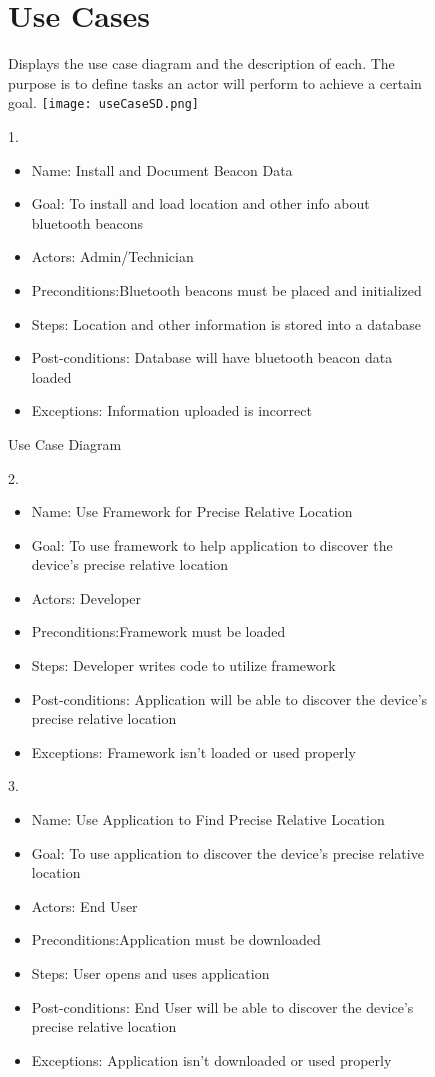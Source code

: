 \begin{figure}
\chapter{Use Cases}
Displays the use case diagram and the description of each. The purpose is to define tasks an actor will perform to achieve a certain goal.
\newline
\texttt{[image: useCaseSD.png]}
\caption{Use Case Diagram}

1.
\begin{itemize}
\item Name: Install and Document Beacon Data
\item Goal: To install and load location and other info about bluetooth beacons
\item Actors: Admin/Technician
\item Preconditions:Bluetooth beacons must be placed and initialized
\item Steps: Location and other information is stored into a database
\item Post-conditions: Database will have bluetooth beacon data loaded
\item Exceptions: Information uploaded is incorrect
\end{itemize}
\end{figure}
\begin{figure}
2.
\begin{itemize}
\item Name: Use Framework for Precise Relative Location
\item Goal: To use framework to help application to discover the device's precise relative location
\item Actors: Developer
\item Preconditions:Framework must be loaded
\item Steps: Developer writes code to utilize framework
\item Post-conditions: Application will be able to discover the device's precise relative location
\item Exceptions: Framework isn't loaded or used properly
\end{itemize}
3.
\begin{itemize}
\item Name: Use Application to Find Precise Relative Location
\item Goal: To use application to discover the device's precise relative location
\item Actors: End User
\item Preconditions:Application must be downloaded
\item Steps: User opens and uses application
\item Post-conditions: End User will be able to discover the device's precise relative location
\item Exceptions: Application isn't downloaded or used properly
\end{itemize}
\end{figure}
